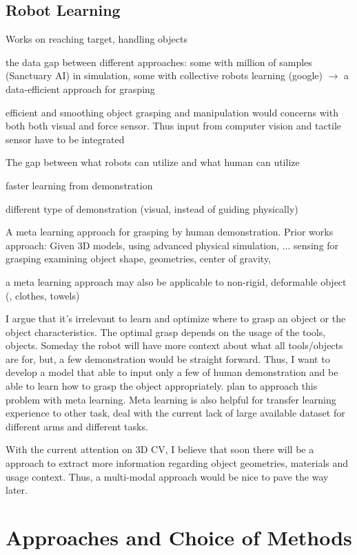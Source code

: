 \subsection{Robot Learning}
Works on reaching target, handling objects

the data gap between different approaches: some with million of samples (Sanctuary AI) in simulation, some with collective robots learning (google) $\rightarrow$ a data-efficient approach for grasping

efficient and smoothing object grasping and manipulation would concerns with both both visual and force sensor. Thus input from computer vision and tactile sensor have to be integrated \cite{haddadin2018tactile}

The gap between what robots can utilize and what human can utilize

faster learning from demonstration

different type of demonstration (visual, instead of guiding physically)

A meta learning approach for grasping by human demonstration. Prior works approach:
Given 3D models, using advanced physical simulation, ...
sensing for grasping
examining object shape, geometries, center of gravity, \etc

a meta learning approach may also be applicable to non-rigid, deformable object (\eg, clothes, towels)

I argue that it's irrelevant to learn and optimize where to grasp an object or the object characteristics. The optimal grasp depends on the usage of the tools, objects. Someday the robot will have more context about what all tools/objects are for, but, a few demonstration would be straight forward. Thus, I want to develop a model that able to input only a few of human demonstration and be able to learn how to grasp the object appropriately.
plan to approach this problem with meta learning. Meta learning is also helpful for transfer learning experience to other task, deal with the current lack of large available dataset for different arms and different tasks.

With the current attention on 3D CV, I believe that soon there will be a approach to extract more information regarding object geometries, materials and usage context. Thus, a multi-modal approach would be nice to pave the way later.

\section{Approaches and Choice of Methods}
